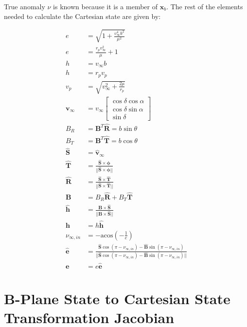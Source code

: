 \documentclass[]{article}
\newcommand{\vb}[1]{\bm{#1}} %
\newcommand{\vbh}[1]{\hat{\bm{#1}}} %
\begin{document}
\noindent True anomaly $\nu$ is known because it is a member of $\vb{x}_b$. The rest of the elements needed to calculate the Cartesian state are given by:

\begin{align}
	e &= \sqrt{1 + \frac{v_{\infty}^4 b^2}{\mu^2}} \\
	e &= \frac{r_p v_{\infty}^2}{\mu} + 1 \\
	h &= v_{\infty} b \\
	h &= r_p v_p \\
	v_p &= \sqrt{v_{\infty}^2 + \frac{2 \mu}{r_p}} \\
	\vb{v}_{\infty} &= v_{\infty} \left[ \begin{array}{c}
	\cos{\delta} \cos{\alpha} \\
	\cos{\delta} \sin{\alpha} \\
	\sin{\delta}
	\end{array} \right] \\
	B_R &= \vb{B}^T \vbh{R} = b \sin{\theta} \\
	B_T &= \vb{B}^T \vbh{T} = b \cos{\theta} \\
	\vbh{S} &= \vbh{v}_{\infty} \\
	\vbh{T} &= \frac{\vbh{S} \times \vb{\phi}}{||\vbh{S} \times \vb{\phi}||} \\
	\vbh{R} &= \frac{\vbh{S} \times \vbh{T}}{||\vbh{S} \times \vbh{T}||} \\
	\vb{B} &= B_R \vbh{R} + B_T \vbh{T} \\
	\vbh{h} &= \frac{\vb{B} \times \vbh{S}}{||\vb{B} \times \vbh{S}||} \\
	\vb{h} &= h \vbh{h} \\
	\nu_{\infty, in} &= - \mathrm{acos} \left( - \frac{1}{e} \right) \\
	\label{eq:ehat_in}
	\vbh{e} &= \frac{\vbh{S} \cos \left(\pi - \nu_{\infty, in} \right) - \vbh{B} \sin \left(\pi - \nu_{\infty, in} \right)}{||\vbh{S} \cos \left(\pi - \nu_{\infty, in} \right) - \vbh{B} \sin \left(\pi - \nu_{\infty, in} \right)||} \\
	\vb{e} &= e \vbh{e}
\end{align}


\section{B-Plane State to Cartesian State Transformation Jacobian}
\label{sec:bplane2cartesianjac}
\end{document}
